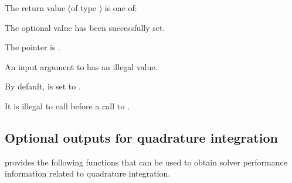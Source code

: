 {
  The return value  (of type ) is one of:
  \begin{args}
  \item[\Id{CV\_SUCCESS}] 
    The optional value has been successfully set.
  \item[\Id{CV\_MEM\_NULL}]
    The  pointer is .
  \item[\Id{CV\_ILL\_INPUT}] 
    An input argument to  has an illegal value.
  \end{args}
}
{
  By default,  is set to . 

  {\warn} It is illegal to call  before a call 
  to .
}


\subsection{Optional outputs for quadrature integration}\label{ss:quad_optional_output}

{\cvodes} provides the following functions that can be used to obtain solver
performance information related to quadrature integration.

